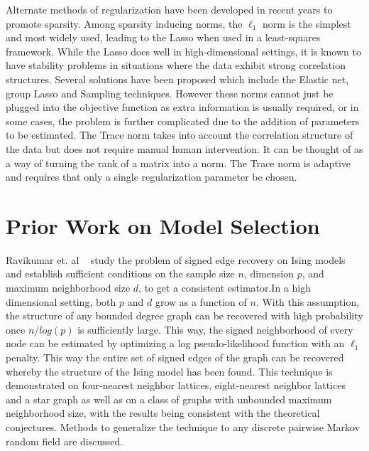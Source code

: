 \documentclass[11pt]{article}
\begin{document}
Alternate methods of regularization have been developed in recent years to promote sparsity. Among sparsity inducing norms, the $\ell_1$ norm is the simplest and most widely used, leading to the Lasso when used in a least-squares framework. While the Lasso does well in high-dimensional settings, it is known to have stability problems in situations where the data exhibit strong correlation structures. Several solutions have been proposed which include the Elastic net, group Lasso and Sampling techniques. However these norms cannot just be plugged into the objective function as extra information is usually required, or in some cases, the problem is further complicated due to the addition of parameters to be estimated. The Trace norm takes into account the correlation structure of the data but does not require manual human intervention. It can be thought of as a way of turning the rank of a matrix into a norm. The Trace norm is adaptive and requires that only a single regularization parameter be chosen. 	

\section{Prior Work on Model Selection}
Ravikumar et. al ~\cite{ravikumar2010high} study the problem of signed edge recovery on Ising models and establish sufficient conditions on the sample size $n$, dimension $p$, and maximum neighborhood size $d$, to get a consistent estimator.In a high dimensional setting, both $p$ and $d$ grow as a function of $n$. With this assumption, the structure of any bounded degree graph can be recovered with high probability once $n/log(p)$ is sufficiently large. This way, the signed neighborhood of every node can be estimated by optimizing a log pseudo-likelihood function with an $\ell_1$ penalty. This way the entire set of signed edges of the graph can be recovered whereby the structure of the Ising model has been found. This technique is demonstrated on four-nearest neighbor lattices, eight-nearest neighbor lattices and a star graph as well as on a class of graphs with unbounded maximum neighborhood size, with the results being consistent with the theoretical conjectures. Methods to generalize the technique to any discrete pairwise Markov random field are discussed.\\
\end{document}
